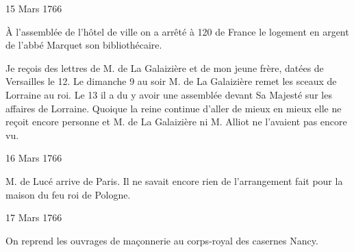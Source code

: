                      \begin{diary}{15 Mars 1766}{}
                        
                         À l'assemblée de l'hôtel de ville on a
                           arrêté à 120 de France le logement en
                           argent de l'abbé Marquet son bibliothécaire. \bigskip
        
        
                         Je reçois des lettres de M. de La Galaizière et
                           de mon jeune frère, datées de Versailles
                           le 12. Le
                              dimanche 9 au soir M. de La Galaizière
                           remet les sceaux de Lorraine
                           au roi.
                           Le 13 il a du y avoir une
                           assemblée devant
                           Sa Majesté sur les affaires de Lorraine.
                           Quoique la reine
                           continue d'aller de mieux
                           en mieux elle ne reçoit encore personne
                           et M. de La Galaizière ni M. Alliot
                           ne l'avaient
                           pas encore vu. \bigskip
        
        
                     \end{diary}

                     \begin{diary}{16 Mars 1766}{}
                        
                        
                           M. de Lucé arrive de Paris. Il ne savait
                           encore rien de l'arrangement fait pour la
                           maison du feu roi de Pologne. \bigskip
        
        
                     \end{diary}

                     \begin{diary}{17 Mars 1766}{}
                        
                         On reprend les ouvrages de maçonnerie
                           au corps-royal des casernes Nancy. \bigskip
        
        
                     \end{diary}
                     
